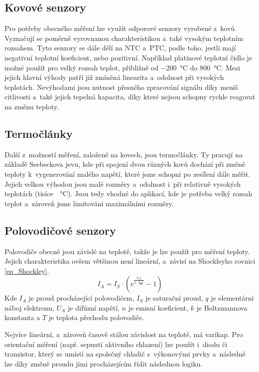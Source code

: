 \subsection{Kovové senzory}

Pro potřeby obecného měření lze využít odporové senzory vyrobené z~kovů. Vyznačují se poměrně vyrovnanou charakteristikou a~také vysokým teplotním rozsahem. Tyto senzory se dále dělí na NTC a~PTC, podle toho, jestli mají negativní teplotní koeficient, nebo pozitivní. Například platinové teplotní čidlo je možné použít pro velký rozsah teplot, přibližně od \SI{-200}{\celsius} do \SI{800}{\celsius}. Mezi jejich hlavní výhody patří již zmíněná linearita a~odolnost při vysokých teplotách. Nevýhodami jsou nutnost přesného zpracování signálu díky menší citlivosti a~také jejich tepelná kapacita, díky které nejsou schopny rychle reagovat na změnu teploty.

\subsection{Termočlánky}

Další z~možností měření, založené na kovech, jsou termočlánky. Ty pracují na základě Seebeckova jevu, kde při spojení dvou různých kovů dochází při změně teploty k~vygenerování malého napětí, které jsme schopni po zesílení dále měřit. Jejich velkou výhodou jsou malé rozměry a~odolnost i~při relativně vysokých teplotách (tisíce~\SI{}{\celsius}). Jsou tedy vhodné do aplikací, kde je potřeba velký rozsah teplot a~zároveň jsme limitováni maximálními rozměry.

\subsection{Polovodičové senzory}

Polovodiče obecně jsou závislé na teplotě, takže je lze použít pro měření teploty. Jejich charakteristika ovšem většinou není lineární, a~závisí na Shockleyho rovnici \eqref{eq_Shockley}.
\begin{equation}
    I_A =I_S \cdot (\mathrm{e} ^{\frac{U_A}{n \cdot \frac{k \cdot T}{q}}} - 1)
    \label{eq_Shockley}
\end{equation}
Kde $I_{A}$ je proud procházející polovodičem, $I_{S}$ je saturační proud, $q$ je elementární náboj elektronu, $U_{A}$ je difúzní napětí, $n$ je emisní koeficient, $k$ je Boltzmannova konstanta a $T$ je teplota přechodu polovodiče.

Nejvíce lineární, a~zároveň časově stálou závislost na teplotě, má varikap. Pro orientační měření (např. sepnutí aktivního chlazení) lze použít i~diodu či tranzistor, který se umístí na společný chladič s~výkonovými prvky a~následně lze díky změně proudu jimi procházejícím řídit následnou logiku.

